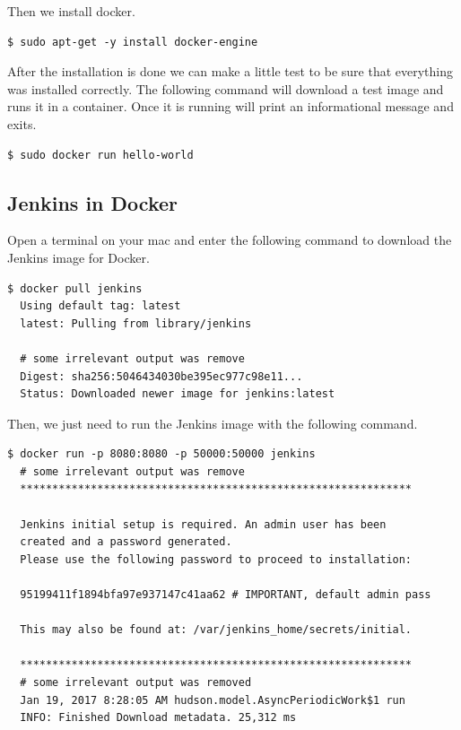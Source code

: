 Then we install docker.

\begin{verbatim}
$ sudo apt-get -y install docker-engine
\end{verbatim}

After the installation is done we can make a little test to be sure that everything was installed correctly. The following command will download a test image and runs it in a container. Once it is running will print an informational message and exits.

\begin{verbatim}
$ sudo docker run hello-world
\end{verbatim}

\subsection{Jenkins in Docker}
Open a terminal on your mac and enter the following command to download the Jenkins image for Docker.

\begin{verbatim}
$ docker pull jenkins
  Using default tag: latest
  latest: Pulling from library/jenkins

  # some irrelevant output was remove
  Digest: sha256:5046434030be395ec977c98e11...
  Status: Downloaded newer image for jenkins:latest
\end{verbatim}

Then, we just need to run the Jenkins image with the following command.

\begin{verbatim}
$ docker run -p 8080:8080 -p 50000:50000 jenkins
  # some irrelevant output was remove
  *************************************************************

  Jenkins initial setup is required. An admin user has been 
  created and a password generated.
  Please use the following password to proceed to installation:

  95199411f1894bfa97e937147c41aa62 # IMPORTANT, default admin pass

  This may also be found at: /var/jenkins_home/secrets/initial.
 
  *************************************************************
  # some irrelevant output was removed
  Jan 19, 2017 8:28:05 AM hudson.model.AsyncPeriodicWork$1 run
  INFO: Finished Download metadata. 25,312 ms
\end{verbatim}

